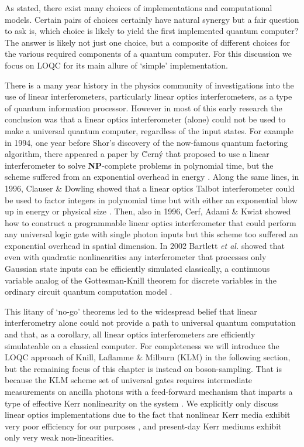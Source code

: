 \documentclass[aps,pra,twocolumn,amsmath,amssymb,nofootinbib,superscriptaddress]{revtex4}
\begin{document}
As stated, there exist many choices of implementations and computational models. Certain pairs of choices certainly have natural synergy but a fair question to ask is, which choice is likely to yield the first implemented quantum computer? The answer is likely not just one choice, but a composite of different choices for the various required components of a quantum computer. For this discussion we focus on LOQC for its main allure of `simple' implementation.

There is a many year history in the physics community of investigations into the use of linear interferometers, particularly linear optics interferometers, as a type of quantum information processor. However in most of this early research the conclusion was that a linear optics interferometer (alone) could not be used to make a universal quantum computer, regardless of the input states. For example in 1994, one year before Shor's discovery of the now-famous quantum factoring algorithm, there appeared a paper by {\u C}ern{\' y} that proposed to use a linear interferometer to solve \textbf{NP}-complete problems in polynomial time, but the scheme suffered from an exponential overhead in energy \cite{cerny}. Along the same lines, in 1996, Clauser \& Dowling showed that a linear optics Talbot interferometer could be used to factor integers in polynomial time but with either an exponential blow up in energy or physical size \cite{clauser}. Then, also in 1996, Cerf, Adami \& Kwiat showed how to construct a programmable linear optics interferometer that could perform any universal logic gate with single photon inputs but this scheme too suffered an exponential overhead in spatial dimension. In 2002 Bartlett \emph{et al.} showed that even with quadratic nonlinearities any interferometer that processes only Gaussian state inputs can be efficiently simulated classically, a continuous variable analog of the Gottesman-Knill theorem for discrete variables in the ordinary circuit quantum computation model \cite{bart}. 

This litany of `no-go' theorems led to the widespread belief that linear interferometry alone could not provide a path to universal quantum computation and that, as a corollary, all linear optics interferometers are efficiently simulateable on a classical computer. For completeness we will introduce the LOQC approach of Knill, Laflamme \& Milburn (KLM) \cite{knill,kok} in the following section, but the remaining focus of this chapter is instead on boson-sampling. That is because the KLM scheme set of universal gates requires intermediate measurements on ancilla photons with a feed-forward mechanism that imparts a type of effective Kerr nonlinearity on the system \cite{lap}. We explicitly only discuss linear optics implementations due to the fact that nonlinear Kerr media exhibit very poor efficiency for our purposes \cite{nielsen}, and present-day Kerr mediums exhibit only very weak non-linearities.
\end{document}
